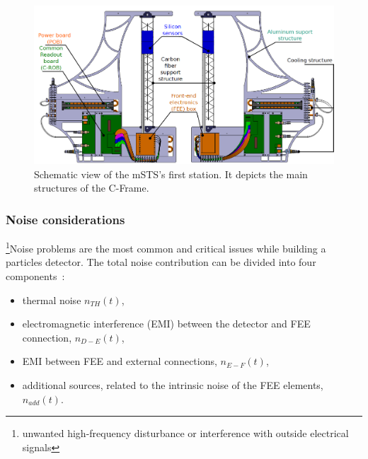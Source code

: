 \begin{figure}[!h]
\centering
\includegraphics[width=0.9\columnwidth]{Chapter6/DCS/images/unit0.png}
\caption{Schematic view of the \gls{mSTS}'s first station. It depicts the main structures of the C-Frame. }
\label{fig_msts_scheme}
\end{figure}


\subsubsection{Noise considerations}
\footnote{unwanted high-frequency disturbance or interference with outside electrical signals}{Noise} problems are the most common and critical issues while building a particles detector. The total noise contribution can be divided into four components~\cite{noise_twepp2008}:
\begin{itemize}
    \item thermal noise $n_{TH}(t)$,
    \item electromagnetic interference (\gls{EMI}) between the detector and \gls{FEE} connection, $n_{D-E}(t)$,
    \item \gls{EMI} between \gls{FEE} and external connections, $n_{E-F}(t)$,
    \item additional sources, related to the intrinsic noise of the FEE elements, $n_{add}(t)$.
\end{itemize}

